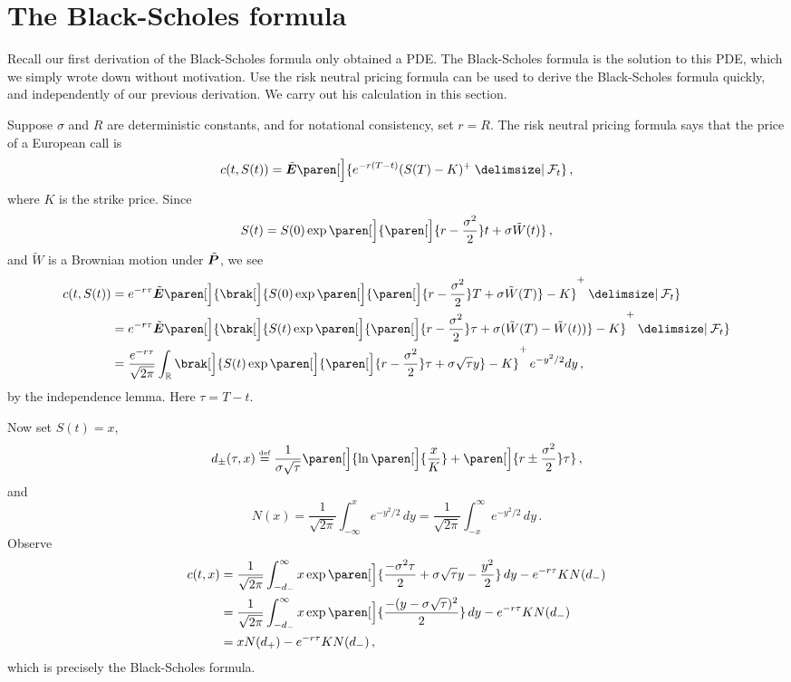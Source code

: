 \section{The Black-Scholes formula}

Recall our first derivation of the Black-Scholes formula only obtained a PDE.
The Black-Scholes formula is the solution to this PDE, which we simply wrote down without motivation.
Use the risk neutral pricing formula can be used to derive the Black-Scholes formula quickly, and independently of our previous derivation.
We carry out his calculation in this section.


Suppose $\sigma$ and $R$ are deterministic constants, and for notational consistency, set $r = R$.
The risk neutral pricing formula says that the price of a European call is
\begin{equation*}
  c(t, S(t)) = \tilde\E\paren[\Big]{
    e^{-r(T-t)}	(S(T) - K)^+ \given \mathcal F_t
  }\,,
\end{equation*}
where $K$ is the strike price.
Since
\begin{equation*}
  S(t) = S(0) \exp\paren[\Big]{ \paren[\Big]{ r - \frac{\sigma^2}{2}} t + \sigma \tilde W(t) }\,,
\end{equation*}
and $\tilde W$ is a Brownian motion under $\tilde\P$, we see
\begin{align*}
  c(t, S(t))
    &= e^{-r\tau} \tilde\E\paren[\Big]{\brak[\Big]{
	S(0) \exp\paren[\Big]{ \paren[\Big]{ r - \frac{\sigma^2}{2} } T + \sigma \tilde W(T)} -K }^+
      \given \mathcal F_t }
  \\
    &= e^{-r\tau} \tilde\E\paren[\Big]{
      \brak[\Big]{S(t) \exp\paren[\Big]{ \paren[\Big]{r - \frac{\sigma^2}{2}} \tau + \sigma (\tilde W(T) - \tilde W(t))} - K }^+ \given \mathcal F_t }
  \\
    &= \frac{e^{-r \tau}}{\sqrt{2\pi}}
	\int_\R 
	  \brak[\Big]{S(t) \exp\paren[\Big]{ \paren[\Big]{r - \frac{\sigma^2}{2}} \tau + \sigma \sqrt{\tau} y} - K }^+ \, e^{-y^2 / 2} dy\,,
\end{align*}
by the independence lemma.
Here $\tau = T - t$.

Now set $S(t) = x$,
\begin{equation*}
  d_\pm( \tau, x ) \defeq
  \frac{1}{\sigma \sqrt{\tau}}\paren[\Big]{
    \ln\paren[\Big]{\frac{x}{K}}
    + \paren[\Big]{ r \pm \frac{\sigma^2}{2} } \tau
  }\,,
\end{equation*}
and
\begin{equation*}
  N(x)
    = \frac{1}{\sqrt{2\pi}} \int_{-\infty}^x e^{-y^2/2} \, dy
    = \frac{1}{\sqrt{2\pi}} \int_{-x}^\infty e^{-y^2/2} \, dy\,.
\end{equation*}
Observe
\begin{align*}
  c(t, x)
    &= \frac{1}{\sqrt{2\pi}} \int_{-d_-}^\infty 
	x \exp\paren[\Big]{ \frac{-\sigma^2 \tau}{2} + \sigma\sqrt{\tau} y - \frac{y^2}{2} } \, dy
	- e^{-r\tau} K N(d_-)
  \\
    &= \frac{1}{\sqrt{2\pi}} \int_{-d_-}^\infty 
	x \exp\paren[\Big]{ \frac{-(y - \sigma \sqrt{\tau})^2}{2}} \, dy
	- e^{-r\tau} K N(d_-)
  \\
    &= x N(d_+) 
	- e^{-r\tau} K N(d_-)\,,
\end{align*}
which is precisely the Black-Scholes formula.


